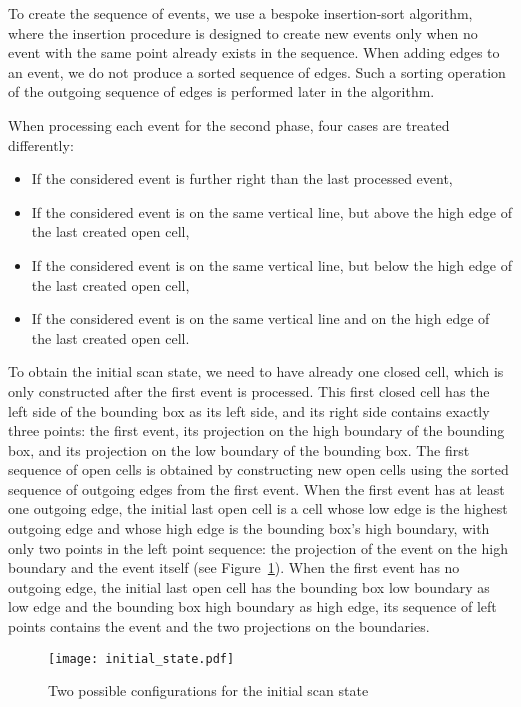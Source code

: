 \documentclass[a4paper, USenglish, cleveref, autoref, thm-restate, final]{lipics-v2021}
\begin{document}
To create the sequence of events,
we use a bespoke insertion-sort algorithm, where the insertion
procedure is designed to create new events only when no event with the
same point already exists in the sequence.  When adding edges to an
event, we do not produce a sorted sequence of edges.  Such a sorting
operation of the outgoing sequence of edges is performed later in the
algorithm.

When processing each event for the second phase,
four cases are treated differently:
\begin{itemize}
\item If the considered event is further right than the last processed event,
\item If the considered event is on the same vertical line, but above the
high edge of the last created open cell,
\item If the considered event is on the same vertical line, but below the
high edge of the last created open cell,
\item If the considered event is on the same vertical line and on the
  high edge of the last created open cell.
\end{itemize}

To obtain the initial scan state, we need to have already one closed
cell, which is only constructed after the first event is processed.
This first closed cell has the left side of the bounding box as its left
side, and its right side contains exactly three points: the first
event, its projection on the high boundary of the bounding box, and its
projection on the low boundary of the bounding box.  The first
sequence of open cells is obtained by constructing new open cells
using the sorted sequence of outgoing edges from the first event.
When the first event has at least
one outgoing edge, the initial last open cell is a cell whose low edge
is the highest outgoing edge and whose high edge is the bounding box's
high boundary, with only two points in the left point sequence: the
projection of the event on the high boundary and the event itself (see Figure~\ref{figure:initial}).
When the first event has no outgoing edge, the initial last open cell
has the bounding box low boundary as low edge and the bounding box
high boundary as high edge, its sequence of left points contains the
event and the two projections on the boundaries.
\begin{figure}
\texttt{[image: initial\_state.pdf]}
\caption{\label{figure:initial}Two possible configurations for the initial scan state}
\end{figure}
\end{document}
